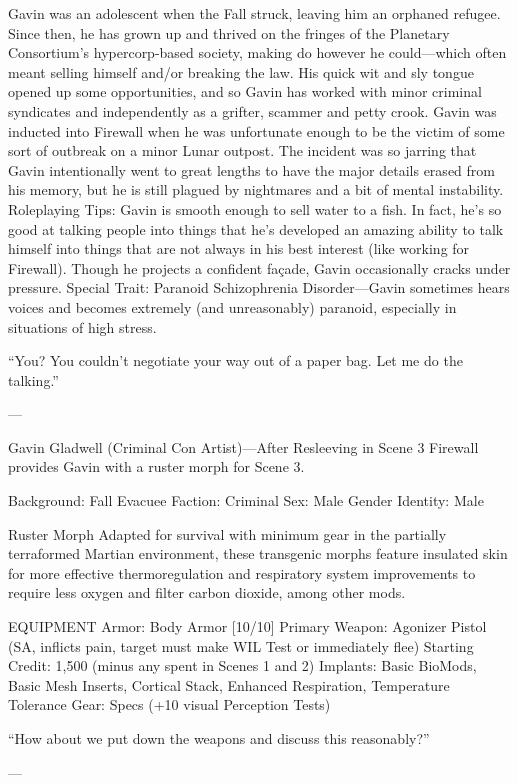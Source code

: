 Gavin was an adolescent when the Fall struck, leaving him an orphaned refugee. Since then, he has grown up and thrived on the fringes of the Planetary Consortium’s hypercorp-based society, making do however he could—which often meant selling himself and/or breaking the law. His quick wit and sly tongue opened up some opportunities, and so Gavin has worked with minor criminal syndicates and independently as a grifter, scammer and petty crook. Gavin was inducted into Firewall when he was unfortunate enough to be the victim of some sort of outbreak on a minor Lunar outpost. The incident was so jarring that Gavin intentionally went to great lengths to have the major details erased from his memory, but he is still plagued by nightmares and a bit of mental instability.
Roleplaying Tips: Gavin is smooth enough to sell water to a fish. In fact, he’s so good at talking people into things that he’s developed an amazing ability to talk himself into things that are not always in his best interest (like working for Firewall). Though he projects a confident façade, Gavin occasionally cracks under pressure.
Special Trait: Paranoid Schizophrenia Disorder—Gavin sometimes hears voices and becomes extremely (and unreasonably) paranoid, especially in situations of high stress.

“You? You couldn't negotiate your way out of a paper bag. Let me do the talking.”

---

Gavin Gladwell (Criminal Con Artist)—After Resleeving in Scene 3
Firewall provides Gavin with a ruster morph for Scene 3.

Background: Fall Evacuee
Faction: Criminal
Sex: Male
Gender Identity: Male

Ruster Morph
Adapted for survival with minimum gear in the partially terraformed Martian environment, these transgenic morphs feature insulated skin for more effective thermoregulation and respiratory system improvements to require less oxygen and filter carbon dioxide, among other mods.

EQUIPMENT
Armor: Body Armor [10/10]
Primary Weapon: Agonizer Pistol (SA, inflicts pain, target must make WIL Test or immediately flee)
Starting Credit: 1,500 (minus any spent in Scenes 1 and 2)
Implants: Basic BioMods, Basic Mesh Inserts, Cortical Stack, Enhanced Respiration, Temperature Tolerance
Gear: Specs (+10 visual Perception Tests)

“How about we put down the weapons and discuss this reasonably?”

---

